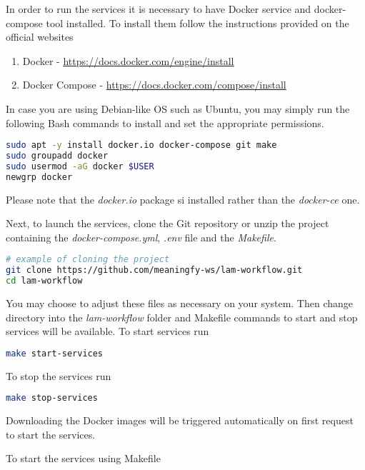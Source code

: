 In order to run the services it is necessary to have Docker \citep{docker} service and docker-compose tool installed. To install them follow the instructions provided on the official websites

\begin{enumerate}
	\item Docker - \url{https://docs.docker.com/engine/install}
	\item Docker Compose - \url{https://docs.docker.com/compose/install}
\end{enumerate}

In case you are using Debian-like OS such as Ubuntu, you may simply run the following Bash commands to install and set the appropriate permissions.

\begin{lstlisting}[language=bash,]
sudo apt -y install docker.io docker-compose git make
sudo groupadd docker
sudo usermod -aG docker $USER
newgrp docker
\end{lstlisting}

Please note that the \textit{docker.io} package si installed rather than the \textit{docker-ce} one.

Next, to launch the services, clone the Git repository or unzip the project containing the \textit{docker-compose.yml}, \textit{.env} file and the \textit{Makefile}. 

\begin{lstlisting}[language=bash,]
# example of cloning the project
git clone https://github.com/meaningfy-ws/lam-workflow.git
cd lam-workflow
\end{lstlisting}

You may choose to adjust these files as necessary on your system. Then change directory into the \textit{lam-workflow} folder and Makefile commands to start and stop services will be available. To start services run

\begin{lstlisting}[language=bash,]
make start-services
\end{lstlisting}

To stop the services run 

\begin{lstlisting}[language=bash,]
make stop-services
\end{lstlisting}

Downloading the Docker images will be triggered automatically on first request to start the services.

To start the services using Makefile

